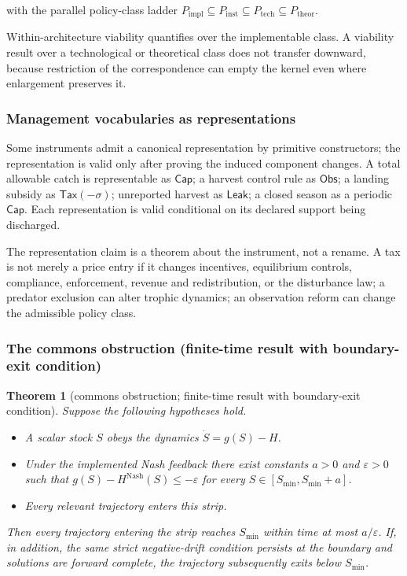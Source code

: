 \documentclass[preprint,11pt,authoryear]{elsarticle}
\newtheorem{theorem}{Theorem}
\theoremstyle{remark}
\begin{document}
with the parallel policy-class ladder $P_{\mathrm{impl}} \subseteq P_{\mathrm{inst}} \subseteq P_{\mathrm{tech}} \subseteq P_{\mathrm{theor}}$.

Within-architecture viability quantifies over the implementable class. A viability result over a technological or theoretical class does not transfer downward, because restriction of the correspondence can empty the kernel even where enlargement preserves it.

\subsubsection{Management vocabularies as representations}

Some instruments admit a canonical representation by primitive constructors; the representation is valid only after proving the induced component changes. A total allowable catch is representable as $\mathsf{Cap}$; a harvest control rule as $\mathsf{Obs}$; a landing subsidy as $\mathsf{Tax}(-\sigma)$; unreported harvest as $\mathsf{Leak}$; a closed season as a periodic $\mathsf{Cap}$. Each representation is valid conditional on its declared support being discharged.

The representation claim is a theorem about the instrument, not a rename. A tax is not merely a price entry if it changes incentives, equilibrium controls, compliance, enforcement, revenue and redistribution, or the disturbance law; a predator exclusion can alter trophic dynamics; an observation reform can change the admissible policy class.

\subsubsection{The commons obstruction (finite-time result with boundary-exit condition)}

\begin{theorem}[commons obstruction; finite-time result with boundary-exit condition]\label{thm:si:commons}
Suppose the following hypotheses hold.
\begin{itemize}[leftmargin=3em]
\item[(H1)] A scalar stock $S$ obeys the dynamics $\dot S = g(S) - H$.
\item[(H2)] Under the implemented Nash feedback there exist constants $a > 0$ and $\varepsilon > 0$ such that
$g(S) - H^{\mathrm{Nash}}(S) \le -\varepsilon$ for every $S \in [S_{\min}, S_{\min} + a]$.
\item[(H3)] Every relevant trajectory enters this strip.
\end{itemize}
Then every trajectory entering the strip reaches $S_{\min}$ within time at most $a/\varepsilon$. If, in addition, the same strict negative-drift condition persists at the boundary and solutions are forward complete, the trajectory subsequently exits below $S_{\min}$.
\end{theorem}
\end{document}
